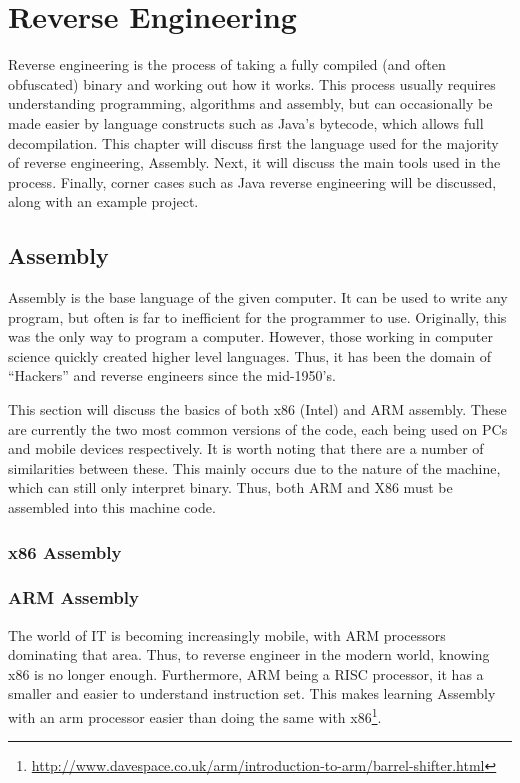 \chapter{Reverse Engineering}
	\label{ch:ReverseEngineering}
	Reverse engineering is the process of taking a fully compiled (and often obfuscated) binary and working out how it works. 
	This process usually requires understanding programming, algorithms and assembly, but can occasionally be made easier by language constructs such as Java's bytecode, which allows full decompilation. 
	This chapter will discuss first the language used for the majority of reverse engineering, Assembly. 
	Next, it will discuss the main tools used in the process. 
	Finally, corner cases such as Java reverse engineering will be discussed, along with an example project. 

	\section{Assembly}
		Assembly is the base language of the given computer. 
		It can be used to write any program, but often is far to inefficient for the programmer to use. 
		Originally, this was the only way to program a computer. 
		However, those working in computer science quickly created higher level languages. 
		Thus, it has been the domain of ``Hackers'' and reverse engineers since the mid-1950's. 

		This section will discuss the basics of both x86 (Intel) and ARM assembly. 
		These are currently the two most common versions of the code, each being used on PCs and mobile devices respectively. 
		It is worth noting that there are a number of similarities between these. 
		This mainly occurs due to the nature of the machine, which can still only interpret binary. 
		Thus, both ARM and X86 must be assembled into this machine code. 
		\subsection{x86 Assembly}

		\subsection{ARM Assembly}
			The world of IT is becoming increasingly mobile, with ARM processors dominating that area. 
			Thus, to reverse engineer in the modern world, knowing x86 is no longer enough. 
			Furthermore, ARM being a RISC processor, it has a smaller and easier to understand instruction set. 
			This makes learning Assembly with an arm processor easier than doing the same with x86\footnote{\url{http://www.davespace.co.uk/arm/introduction-to-arm/barrel-shifter.html}}. 

